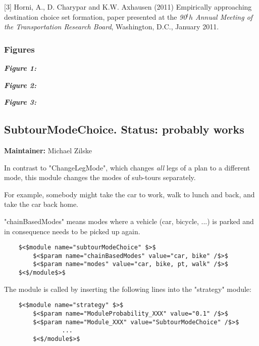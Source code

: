 \documentclass[a4paper,11pt]{report}
\begin{document}
[3] Horni, A., D. Charypar and K.W. Axhausen (2011) Empirically  approaching destination choice set formation, paper presented at the \emph{90$^th$ Annual Meeting of the Transportation Research Board}, Washington, D.C., January 2011.

\subsubsection{Figures}

\emph{\textbf{Figure 1:}}






\emph{\textbf{Figure 2:}}





\emph{\textbf{Figure 3:}}








\subsection{SubtourModeChoice. Status: probably works}

\textbf{Maintainer:} Michael Zilske

In contrast to "ChangeLegMode", which changes \emph{all} legs of a plan to a different mode, this module changes the modes of sub-tours separately.

For example, somebody might take the car to work, walk to lunch and back, and take the car back home.

"chainBasedModes" means modes where a vehicle (car, bicycle,  ...) is parked and in consequence needs to be picked up again.
\begin{verbatim}
	$<$module name="subtourModeChoice" $>$
		$<$param name="chainBasedModes" value="car, bike" /$>$
		$<$param name="modes" value="car, bike, pt, walk" /$>$
	$<$/module$>$

\end{verbatim}

The module is called by inserting the following lines into the "strategy" module:
\begin{verbatim}
	$<$module name="strategy" $>$
		$<$param name="ModuleProbability_XXX" value="0.1" /$>$
		$<$param name="Module_XXX" value="SubtourModeChoice" /$>$
                ...
        $<$/module$>$

\end{verbatim}
\end{document}
